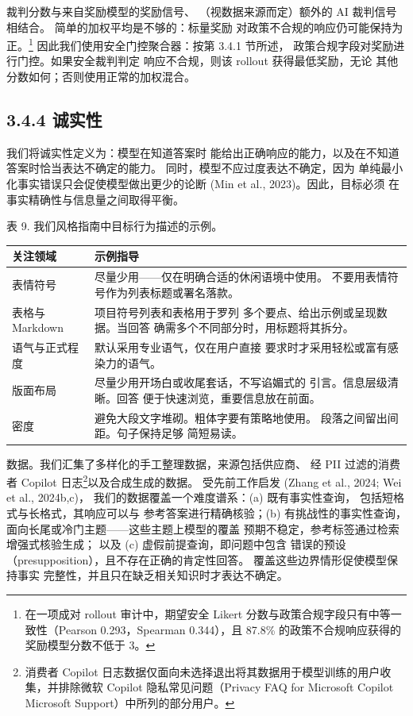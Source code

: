裁判分数与来自奖励模型的奖励信号、
（视数据来源而定）额外的 AI 裁判信号相结合。
简单的加权平均是不够的：标量奖励
对政策不合规的响应仍可能保持为正。\footnote{在一项成对 rollout 审计中，期望安全 Likert 分数与政策合规字段只有中等一致性（Pearson 0.293，Spearman 0.344），且 87.8\% 的政策不合规响应获得的奖励模型分数不低于 3。}
因此我们使用安全门控聚合器：按第 3.4.1 节所述，
政策合规字段对奖励进行门控。如果安全裁判判定
响应不合规，则该 rollout 获得最低奖励，无论
其他分数如何；否则使用正常的加权混合。

\subsection{3.4.4 诚实性}\label{honesty}

我们将诚实性定义为：模型在知道答案时
能给出正确响应的能力，以及在不知道答案时恰当表达不确定的能力。
同时，模型不应过度表达不确定，因为
单纯最小化事实错误只会促使模型做出更少的论断
(Min et al., 2023)。因此，目标必须
在事实精确性与信息量之间取得平衡。



表 9. 我们风格指南中目标行为描述的示例。

{\def\LTcaptype{none} %
\begin{longtable}[]{@{}|l|l|@{}}
\toprule\noalign{}
\endhead
\bottomrule\noalign{}
\endlastfoot
\hline
关注领域 & 示例指导 \\
\hline
表情符号 & 尽量少用——仅在明确合适的休闲语境中使用。
不要用表情符号作为列表标题或署名落款。 \\
\hline
表格与 Markdown & 项目符号列表和表格用于罗列
多个要点、给出示例或呈现数据。当回答
确需多个不同部分时，用标题将其拆分。 \\
\hline
语气与正式程度 & 默认采用专业语气，仅在用户直接
要求时才采用轻松或富有感染力的语气。 \\
\hline
版面布局 & 尽量少用开场白或收尾套话，不写谄媚式的
引言。信息层级清晰。回答
便于快速浏览，重要信息放在前面。 \\
\hline
密度 & 避免大段文字堆砌。粗体字要有策略地使用。
段落之间留出间距。句子保持足够
简短易读。 \\
\hline
\end{longtable}
}

数据。我们汇集了多样化的手工整理数据，来源包括供应商、
经 PII 过滤的消费者 Copilot 日志\footnote{消费者 Copilot 日志数据仅面向未选择退出将其数据用于模型训练的用户收集，并排除微软 Copilot 隐私常见问题（Privacy FAQ for Microsoft Copilot \textbar{} Microsoft Support）中所列的部分用户。}以及合成生成的数据。
受先前工作启发 (Zhang et al., 2024; Wei et al., 2024b,c)，
我们的数据覆盖一个难度谱系：(a) 既有事实性查询，
包括短格式与长格式，其响应可以与
参考答案进行精确核验；(b) 有挑战性的事实性查询，
面向长尾或冷门主题——这些主题上模型的覆盖
预期不稳定，参考标签通过检索增强式核验生成；
以及 (c) 虚假前提查询，即问题中包含
错误的预设（presupposition），且不存在正确的肯定性回答。
覆盖这些边界情形促使模型保持事实
完整性，并且只在缺乏相关知识时才表达不确定。

